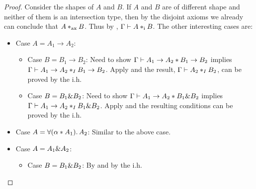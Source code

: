 \begin{proof}

  Consider the shapes of $A$ and $B$. If $A$ and $B$ are of
  different shape and neither of them is an intersection type, then by the
  disjoint axioms we already can conclude that $A *_\textnormal{ax} B$. Thus by
  , $\Gamma \vdash A *_\textnormal{i} B$. The other interesting cases are:

  \begin{itemize}

    \item Case $A = A_1 \to A_2$:

    \begin{itemize}

      \item Case $B = B_1 \to B_2$:
      Need to show $\Gamma \vdash A_1 \to A_2 * B_1 \to B_2$ implies
      $\Gamma \vdash  A_1 \to A_2 *_I B_1 \to B_2$. Apply
       and the result, $\Gamma \vdash A_2 *_I B_2$,
      can be proved by the i.h.

      \item Case $B = B_1 \& B_2$: Need to show $\Gamma \vdash A_1 \to
      A_2 * B_1 \& B_2$ implies $\Gamma \vdash A_1 \to A_2 *_I B_1
      \& B_2$. Apply  and the resulting
      conditions can be proved by the i.h.

    \end{itemize}
    \item Case $A = \forall (\alpha * A_1).\, A_2$: Similar to the above case.


    \item Case $A = A_1 \& A_2$:

    \begin{itemize}
      \item Case $B = B_1 \& B_2$: By  and by the i.h.
    \end{itemize}

  \end{itemize}
\end{proof}
